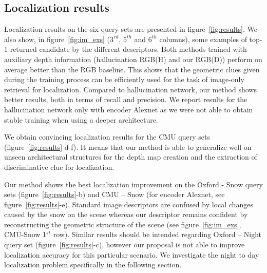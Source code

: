 

\subsection{Localization results}
\label{subsec:results}

Localization results on the six query sets are presented in figure~\ref{fig:results}. We also show, in figure~\ref{fig:im_exs} ($3^{rd}$, $5^{th}$ and $6^{th}$ columns), some examples of top-1 returned candidate by the different descriptors. Both methods trained with auxiliary depth information (hallucination RGB(H) and our RGB(D)) perform on average better than the RGB baseline. This shows that the geometric clues given during the training process can be efficiently used for the task of image-only retrieval for localization. Compared to hallucination network, our method shows better results, both in terms of recall and precision. We report results for the hallucination network only with encoder Alexnet as we were not able to obtain stable training when using a deeper architecture.

We obtain convincing localization results for the CMU query sets (figure~\ref{fig:results} d-f). It means that our method is able to generalize well on unseen architectural structures for the depth map creation and the extraction of discriminative clue for localization.

Our method shows the best localization improvement on the Oxford - Snow query sets (figure~\ref{fig:results}-b) and CMU -- Snow (for encoder Alexnet, see figure~\ref{fig:results}-e). Standard image descriptors are confused by local changes caused by the snow on the scene whereas our descriptor remains confident by reconstructing the geometric structure of the scene (see figure~\ref{fig:im_exs}, CMU-Snow 1$^{st}$ row). Similar results should be intended regarding Oxford -- Night query set (figure~\ref{fig:results}-c), however our proposal is not able to improve localization accuracy for this particular scenario. We investigate the night to day localization problem specifically in the following section.

